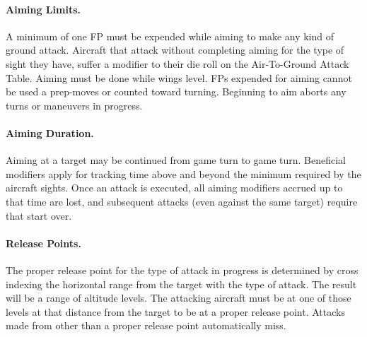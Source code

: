 \paragraph{Aiming Limits.} A minimum of one FP must be expended while aiming to make any kind of ground attack. Aircraft that attack without completing aiming for the type of sight they have, suffer a  modifier to their die roll on the Air-To-Ground Attack Table. Aiming must be done while wings level. FPs expended for aiming cannot be used a prep-moves or counted toward turning. Beginning to aim aborts any turns or maneuvers in progress.  

\paragraph{Aiming Duration.} Aiming at a target may be continued from game turn to game turn. Beneficial modifiers apply for tracking time above and beyond the minimum required by the aircraft sights. Once an attack is executed, all aiming modifiers accrued up to that time are lost, and subsequent attacks (even against the same target) require that start over. 

\paragraph{Release Points.}
\label{rule:release-points} 


The proper release point for the type of attack in progress is determined by cross indexing the horizontal range from the target with the type of attack. The result will be a range of altitude levels. The attacking aircraft must be at one of those levels at that distance from the target to be at a proper release point. Attacks made from other than a proper release point automatically miss.


